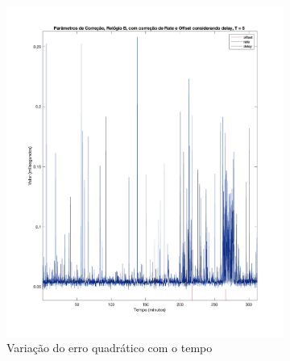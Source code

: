    \begin{figure}[h]
      \begin{subfigure}{0.49\linewidth}
        \centering
        \includegraphics[width=\linewidth]{figures/delay.png}
        \caption{Variação do erro quadrático com o tempo}
        \label{fig:erroQuadratico}
      \end{subfigure}
      \begin{subfigure}{0.49\linewidth}
        \centering

\end{subfigure}
\end{figure}
